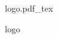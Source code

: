\documentclass{article}
\newcommand{\incfig}[2][1]{%
      \def\svgwidth{#1\columnwidth}
      {#2.pdf_tex}
}
\begin{document}
\begin{figure}[ht]
    \centering
    \incfig{logo}
    \caption{logo}
    \label{fig:logo}
\end{figure}
\end{document}
